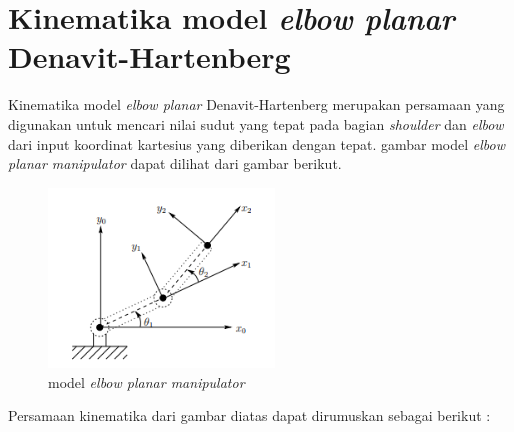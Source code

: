\begin{table}[H]
	\centering
	\caption{Spesifikasi Motor DC pada robot Serpent-1}
\end{table}

\section{Kinematika model \textit{elbow planar} Denavit-Hartenberg}
	Kinematika model \textit{elbow planar} Denavit-Hartenberg merupakan persamaan yang digunakan untuk mencari nilai sudut yang tepat pada bagian \textit{shoulder} dan \textit{elbow} dari input koordinat kartesius yang diberikan dengan tepat\cite{Spong2006}. gambar model \textit{elbow planar manipulator} dapat dilihat dari gambar berikut.
	\begin{figure}[H]
		\centering
		\includegraphics[width=6cm]{gambar/model.png}
		\caption{model \textit{elbow planar manipulator}}
	\end{figure}
	Persamaan kinematika dari gambar diatas dapat dirumuskan sebagai berikut :
	
